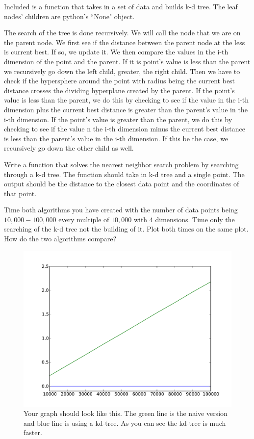 Included is a function that takes in a set of data and builds k-d tree.
The leaf nodes' children are  python's ``None" object.

The search of the tree is done recursively.
We will call the node that we are on the parent node.
We first see if the distance between the parent node at the less is current best.
If so, we update it.
We then compare the values in the i-th dimension of the point and the parent.
If it is point's value is less than the parent we recursively go down the left child, greater, the right child.
Then we have to check if the hypersphere around the point with radius being the current best distance crosses the dividing hyperplane created by the parent.
If the point's value is less than the parent, we do this by checking to see if the value in the i-th dimension plus the current best distance is greater than the parent's value in the i-th dimension.
If the point's value is greater than the parent, we do this by checking to see if the value n the i-th dimension minus the current best distance is less than the parent's value in the i-th dimension.
If this be the case, we recursively go down the other child as well.

\begin{problem}
Write a function that solves the nearest neighbor search problem by searching through a k-d tree.
The function should take in k-d tree and a single point.
The output should be the distance to the closest data point and the coordinates of that point. 
\end{problem}

\begin{problem}
Time both algorithms you have created with the number of data points being $10,000-100,000$ every multiple of $10,000$ with $4$ dimensions.
Time only the searching of the k-d tree not the building of it.
Plot both times on the same plot. How do the two algorithms compare?
\end{problem}

\begin{figure}[H]
\includegraphics[scale = .5]{4dTime.pdf}
\caption{Your graph should look like this.
The green line is the naive version and blue line is using a kd-tree.
As you can see the kd-tree is much faster.}
\end{figure}

